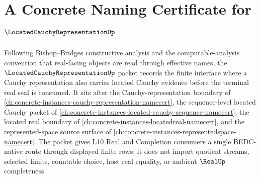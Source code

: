 \chapter{A Concrete Naming Certificate for $\LocatedCauchyRepresentationUp$}
\label{ch:concrete-instances-located-cauchy-representation-namecert}

Following Bishop--Bridges constructive analysis and the computable-analysis convention that real-facing objects are read through effective names, the $\LocatedCauchyRepresentationUp$ packet records the finite interface where a Cauchy representation also carries located Cauchy evidence before the terminal real seal is consumed. It sits after the Cauchy-representation boundary of \autoref{ch:concrete-instances-cauchy-representation-namecert}, the sequence-level located Cauchy packet of \autoref{ch:concrete-instances-located-cauchy-sequence-namecert}, the located real boundary of \autoref{ch:concrete-instances-locatedreal-namecert}, and the represented-space source surface of \autoref{ch:concrete-instances-representedspace-namecert}. The packet gives L10 Real and Completion consumers a single BEDC-native route through displayed finite rows; it does not import quotient streams, selected limits, countable choice, host real equality, or ambient $\RealUp$ completeness.

